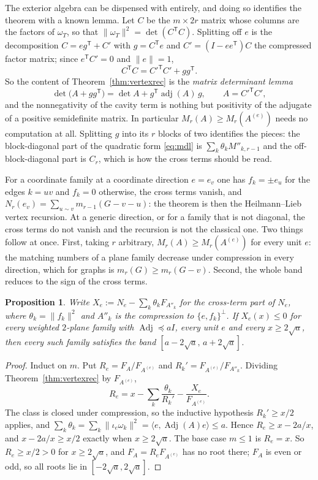 \documentclass[11pt]{article}
\newtheorem{proposition}[theorem]{Proposition}
\theoremstyle{remark}
\begin{document}
The exterior algebra can be dispensed with entirely, and doing so identifies the
theorem with a known lemma. Let $C$ be the $m\times2r$ matrix whose columns are the
factors of $\omega_T$, so that $\|\omega_T\|^2=\det(C^{\mathsf T}C)$. Splitting off
$e$ is the decomposition $C=eg^{\mathsf T}+C'$ with $g=C^{\mathsf T}e$ and
$C'=(I-ee^{\mathsf T})C$ the compressed factor matrix; since $e^{\mathsf T}C'=0$ and
$\|e\|=1$,
\[
C^{\mathsf T}C=C'^{\mathsf T}C'+gg^{\mathsf T} .
\]
So the content of Theorem~\ref{thm:vertexrec} is the \emph{matrix determinant lemma}
\begin{equation}\label{eq:mdl}
\det\bigl(A+gg^{\mathsf T}\bigr)=\det A+g^{\mathsf T}\operatorname{adj}(A)\,g,
\qquad A=C'^{\mathsf T}C' ,
\end{equation}
and the nonnegativity of the cavity term is nothing but positivity of the adjugate of
a positive semidefinite matrix. In particular $M_r(A)\ge M_r(A^{(e)})$ needs no
computation at all. Splitting $g$ into its $r$ blocks of two identifies the pieces:
the block-diagonal part of the quadratic form \eqref{eq:mdl} is
$\sum_k\theta_kM''_{k,r-1}$ and the off-block-diagonal part is $C_r$, which is how the
cross terms should be read.

For a coordinate family at a coordinate direction $e=e_v$ one has $f_k=\pm e_u$ for
the edges $k=uv$ and $f_k=0$ otherwise, the cross terms vanish, and
$N_r(e_v)=\sum_{u\sim v}m_{r-1}(G-v-u)$: the theorem is then the Heilmann--Lieb
vertex recursion. At a generic direction, or for a family that is not diagonal, the
cross terms do not vanish and the recursion is not the classical one. Two things
follow at once. First, taking $r$ arbitrary, $M_r(A)\ge M_r(A^{(e)})$ for every unit
$e$: the matching numbers of a plane family decrease under compression in every
direction, which for graphs is $m_r(G)\ge m_r(G-v)$. Second, the whole band reduces
to the sign of the cross terms.

\begin{proposition}\label{prop:cross}
Write $X_e:=N_e-\sum_k\theta_kF_{A''_k}$ for the cross-term part of $N_e$, where
$\theta_k=\|f_k\|^2$ and $A''_k$ is the compression to $\{e,f_k\}^\perp$. If
$X_e(x)\le0$ for every weighted $2$-plane family with $\operatorname{Adj}\preceq aI$,
every unit $e$ and every $x\ge2\sqrt a$, then every such family satisfies the band
$[a-2\sqrt a,\,a+2\sqrt a]$.
\end{proposition}

\begin{proof}
Induct on $m$. Put $R_e=F_A/F_{A^{(e)}}$ and $R_k'=F_{A^{(e)}}/F_{A''_k}$. Dividing
Theorem~\ref{thm:vertexrec} by $F_{A^{(e)}}$,
\[
R_e=x-\sum_k\frac{\theta_k}{R_k'}-\frac{X_e}{F_{A^{(e)}}} .
\]
The class is closed under compression, so the inductive hypothesis $R_k'\ge x/2$
applies, and $\sum_k\theta_k=\sum_k\|\iota_e\omega_k\|^2
=\langle e,\operatorname{Adj}(A)e\rangle\le a$. Hence $R_e\ge x-2a/x$, and
$x-2a/x\ge x/2$ exactly when $x\ge2\sqrt a$. The base case $m\le1$ is $R_e=x$.
So $R_e\ge x/2>0$ for $x\ge2\sqrt a$, and $F_A=R_eF_{A^{(e)}}$ has no root there;
$F_A$ is even or odd, so all roots lie in $[-2\sqrt a,2\sqrt a]$.
\end{proof}
\end{document}
